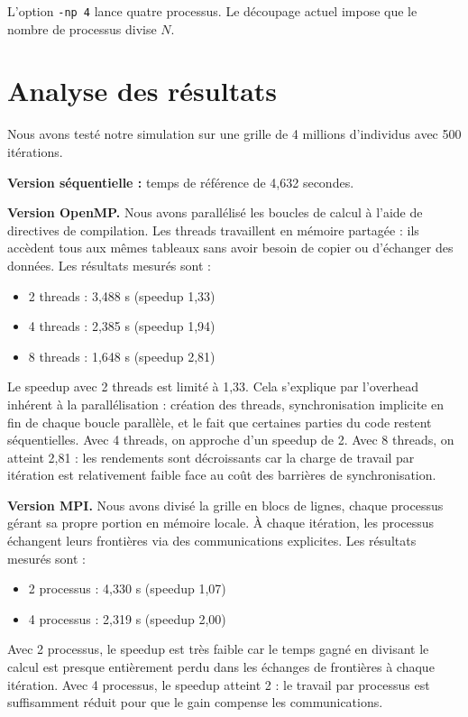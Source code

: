 \documentclass[a4paper,12pt]{article}
\begin{document}
L'option \texttt{-np 4} lance quatre processus. Le découpage actuel impose que
le nombre de processus divise $N$.

\section{Analyse des résultats}
 
Nous avons testé notre simulation sur une grille de 4 millions d'individus avec 500 itérations.
 
\textbf{Version séquentielle :} temps de référence de 4,632 secondes.
 
\textbf{Version OpenMP.} Nous avons parallélisé les boucles de calcul à l'aide de directives de compilation. Les threads travaillent en mémoire partagée : ils accèdent tous aux mêmes tableaux sans avoir besoin de copier ou d'échanger des données. Les résultats mesurés sont :
\begin{itemize}
    \item 2 threads : 3,488 s (speedup 1,33)
    \item 4 threads : 2,385 s (speedup 1,94)
    \item 8 threads : 1,648 s (speedup 2,81)
\end{itemize}
 
Le speedup avec 2 threads est limité à 1,33. Cela s'explique par l'overhead inhérent à la parallélisation : création des threads, synchronisation implicite en fin de chaque boucle parallèle, et le fait que certaines parties du code restent séquentielles. Avec 4 threads, on approche d'un speedup de 2. Avec 8 threads, on atteint 2,81 : les rendements sont décroissants car la charge de travail par itération est relativement faible face au coût des barrières de synchronisation.
 
\textbf{Version MPI.} Nous avons divisé la grille en blocs de lignes, chaque processus gérant sa propre portion en mémoire locale. À chaque itération, les processus échangent leurs frontières via des communications explicites. Les résultats mesurés sont :
\begin{itemize}
    \item 2 processus : 4,330 s (speedup 1,07)
    \item 4 processus : 2,319 s (speedup 2,00)
\end{itemize}
 
Avec 2 processus, le speedup est très faible car le temps gagné en divisant le calcul est presque entièrement perdu dans les échanges de frontières à chaque itération. Avec 4 processus, le speedup atteint 2 : le travail par processus est suffisamment réduit pour que le gain compense les communications.
 
\end{document}
